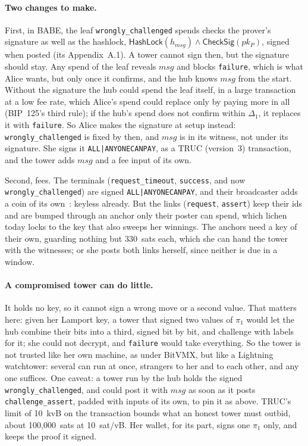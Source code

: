 \documentclass[11pt]{article}
\newcommand{\tx}[1]{\texttt{#1}}
\begin{document}
\paragraph{Two changes to make.} First, in BABE, the leaf
\tx{wrongly\_challenged} spends checks the prover's signature as well as
the hashlock, $\mathsf{HashLock}(h_{\mathit{msg}}) \wedge
\mathsf{CheckSig}(pk_P)$, signed when posted (its Appendix~A.1). A
tower cannot sign then, but the signature should stay. Any spend of the
leaf reveals $\mathit{msg}$ and blocks \tx{failure}, which is what Alice
wants, but only once it confirms, and the hub knows $\mathit{msg}$ from
the start. Without the signature the hub could spend the leaf itself,
in a large transaction at a low fee rate, which Alice's spend could
replace only by paying more in all (BIP~125's third rule); if the hub's
spend does not confirm within $\Delta_1$, it replaces it with
\tx{failure}. So Alice makes the signature at setup instead:
\tx{wrongly\_challenged} is fixed by then, and $\mathit{msg}$ is in its
witness, not under its signature. She signs it
\texttt{ALL|ANYONECANPAY}, as a TRUC (version~3) transaction, and the
tower adds $\mathit{msg}$ and a fee input of its own.

Second, fees. The terminals (\tx{request\_timeout}, \tx{success}, and
now \tx{wrongly\_challenged}) are signed
\texttt{ALL|ANYONECANPAY}, and their broadcaster adds a coin of its
own~\cite[\S 6]{lichenbitvmx}: keyless already. But the links
(\tx{request}, \tx{assert}) keep their ids and are bumped through an
anchor only their poster can spend, which lichen today locks to the key
that also sweeps her winnings. The anchors need a key of their own,
guarding nothing but 330~sats each, which she can hand the tower with
the witnesses; or she posts both links herself, since neither is due in
a window.

\paragraph{A compromised tower can do little.} It holds no key,
so it cannot sign a wrong move or a second value. That matters here:
given her Lamport key, a tower that signed two values of $\pi_1$ would
let the hub combine their bits into a third, signed bit by bit, and
challenge with labels for it; she could not decrypt, and \tx{failure}
would take everything. So the tower is not trusted like her own machine,
as under BitVMX, but like a Lightning watchtower: several can run at
once, strangers to her and to each other, and any one suffices. One
caveat: a tower run by the hub holds the signed
\tx{wrongly\_challenged}, and could post it with $\mathit{msg}$ as soon
as it posts \tx{challenge\_assert}, padded with inputs of its own, to
pin it as above. TRUC's limit of 10~kvB on the transaction bounds what
an honest tower must outbid, about 100,000~sats at 10~sat/vB. Her
wallet, for its part, signs one $\pi_1$ only, and keeps the proof it
signed.
\end{document}
